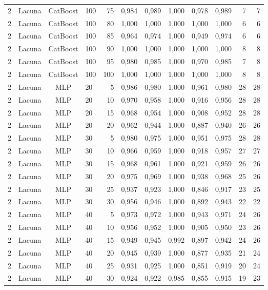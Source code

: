 \begin{longtable}{ccclrrrrrrrr}
2 & Lacuna & CatBoost & 100 & 75 & 0,984 & 0,989 & 1,000 & 0,978 & 0,989 & 7 & 7 \\
2 & Lacuna & CatBoost & 100 & 80 & 1,000 & 1,000 & 1,000 & 1,000 & 1,000 & 6 & 6 \\
2 & Lacuna & CatBoost & 100 & 85 & 0,964 & 0,974 & 1,000 & 0,949 & 0,974 & 6 & 6 \\
2 & Lacuna & CatBoost & 100 & 90 & 1,000 & 1,000 & 1,000 & 1,000 & 1,000 & 8 & 8 \\
2 & Lacuna & CatBoost & 100 & 95 & 0,980 & 0,985 & 1,000 & 0,970 & 0,985 & 7 & 8 \\
2 & Lacuna & CatBoost & 100 & 100 & 1,000 & 1,000 & 1,000 & 1,000 & 1,000 & 8 & 8 \\
2 & Lacuna & MLP & 20 & 5 & 0,986 & 0,980 & 1,000 & 0,961 & 0,980 & 28 & 28 \\
2 & Lacuna & MLP & 20 & 10 & 0,970 & 0,958 & 1,000 & 0,916 & 0,956 & 28 & 28 \\
2 & Lacuna & MLP & 20 & 15 & 0,968 & 0,954 & 1,000 & 0,908 & 0,952 & 28 & 28 \\
2 & Lacuna & MLP & 20 & 20 & 0,962 & 0,944 & 1,000 & 0,887 & 0,940 & 26 & 26 \\
2 & Lacuna & MLP & 30 & 5 & 0,980 & 0,975 & 1,000 & 0,951 & 0,975 & 28 & 28 \\
2 & Lacuna & MLP & 30 & 10 & 0,966 & 0,959 & 1,000 & 0,918 & 0,957 & 27 & 27 \\
2 & Lacuna & MLP & 30 & 15 & 0,968 & 0,961 & 1,000 & 0,921 & 0,959 & 26 & 26 \\
2 & Lacuna & MLP & 30 & 20 & 0,975 & 0,969 & 1,000 & 0,938 & 0,968 & 25 & 26 \\
2 & Lacuna & MLP & 30 & 25 & 0,937 & 0,923 & 1,000 & 0,846 & 0,917 & 23 & 25 \\
2 & Lacuna & MLP & 30 & 30 & 0,956 & 0,946 & 1,000 & 0,892 & 0,943 & 22 & 22 \\
2 & Lacuna & MLP & 40 & 5 & 0,973 & 0,972 & 1,000 & 0,943 & 0,971 & 24 & 26 \\
2 & Lacuna & MLP & 40 & 10 & 0,956 & 0,952 & 1,000 & 0,905 & 0,950 & 23 & 26 \\
2 & Lacuna & MLP & 40 & 15 & 0,949 & 0,945 & 0,992 & 0,897 & 0,942 & 24 & 26 \\
2 & Lacuna & MLP & 40 & 20 & 0,945 & 0,939 & 1,000 & 0,877 & 0,935 & 21 & 24 \\
2 & Lacuna & MLP & 40 & 25 & 0,931 & 0,925 & 1,000 & 0,851 & 0,919 & 20 & 24 \\
2 & Lacuna & MLP & 40 & 30 & 0,924 & 0,922 & 0,985 & 0,855 & 0,915 & 19 & 23 \\

\end{longtable}
